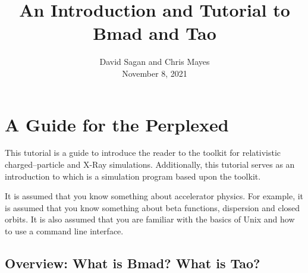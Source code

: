 \documentclass{hitec}     %
\title{An Introduction and Tutorial to Bmad and Tao}
\author{}
\date{David Sagan and Chris Mayes \\ November 8, 2021}
\newcommand{\Section}[1]{\section{#1}\vspace*{-1ex}}
\begin{document}
\maketitle

\cleardoublepage
{}
{}
\tableofcontents

\newpage

\Section{A Guide for the Perplexed}
\label{s:guide}

This tutorial is a guide to introduce the reader to the \bmad toolkit for relativistic
charged--particle and X-Ray simulations. Additionally, this tutorial serves as an introduction
to \tao which is a simulation program based upon the \bmad toolkit.

It is assumed that you know something about accelerator physics. For example, it is assumed that
you know something about beta functions, dispersion and closed orbits. It is also assumed that
you are familiar with the basics of Unix and how to use a command line interface.

\subsection{Overview: What is Bmad? What is Tao?}
\label{s:overview}
\end{document}

